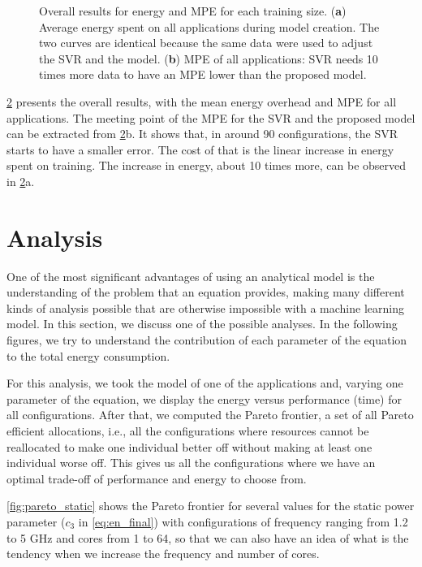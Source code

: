 \begin{figure}[H]
\begin{subfigure}[t]{0.45\textwidth}
		\caption{
		}
		\label{fig:overall_MPE}
	\end{subfigure}
	\caption{Overall results for energy and MPE for each training size. (\textbf{a}) Average energy spent on all applications during model creation. The two curves are identical because the same data were used to adjust the SVR and the model. (\textbf{b}) MPE of all applications: SVR needs 10 times more data to have an MPE lower than the proposed model.}
	\label{fig:overall_train}
\end{figure}

\cref{fig:overall_train} presents the overall results, with the mean energy overhead and MPE for all applications.
The meeting point of the MPE for the SVR and the proposed model can be extracted from \cref{fig:overall_train}b.
It shows that, in around 90 configurations, the SVR starts to have a smaller error. The cost of that is the linear increase in energy spent on training. The increase in energy, about 10 times more, can be observed in \cref{fig:overall_train}a.

\section{Analysis}
One of the most significant advantages of using an analytical model is the understanding of the problem that an equation provides, making many different kinds of analysis possible that are otherwise impossible with a machine learning model. In this section, we discuss one of the possible analyses. In the following figures, we try to understand the contribution of each parameter of the equation to the total energy consumption.

For this analysis, we took the model of one of the applications and, varying one parameter of the equation, we display the energy versus performance (time) for all configurations. After that, we computed the Pareto frontier, a set of all Pareto efficient allocations, i.e., all the configurations where resources cannot be reallocated to make one individual better off without making at least one individual worse off. This gives us all the configurations where we have an optimal trade-off of performance and energy to choose from.


\cref{fig:pareto_static} shows the Pareto frontier for several values for the static power parameter ($c_3$ in \cref{eq:en_final}) with configurations of frequency ranging from 1.2 to 5 GHz and cores from 1 to 64, so that we can also have an idea of what is the tendency when we increase the frequency and number of cores.

